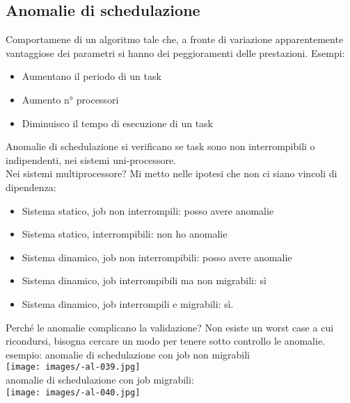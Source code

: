 \documentclass{article}
\begin{document}
\subsection{Anomalie di schedulazione}
Comportamene di un algoritmo tale che, a fronte di variazione apparentemente vantaggiose dei parametri si hanno dei peggioramenti delle prestazioni. Esempi:
\begin{itemize}
\item Aumentano il periodo di un task
\item Aumento n° processori
\item Diminuisco il tempo di esecuzione di un task
\end{itemize}
Anomalie di schedulazione si verificano se task sono non interrompibili o indipendenti, nei sistemi uni-processore.\\ Nei sistemi multiprocessore? Mi metto nelle ipotesi che non ci siano vincoli di dipendenza:\\
\begin{itemize}
\item Sistema statico, job non interrompili: posso avere anomalie
\item Sistema statico, interrompibili: non ho anomalie
\item Sistema dinamico, job non interrompibili: posso avere anomalie
\item Sistema dinamico, job interrompibili ma non migrabili: sì
\item Sistema dinamico, job interrompili e migrabili: sì.
\end{itemize}
Perché le anomalie complicano la validazione? Non esiste un worst case a cui ricondursi, bisogna cercare un modo per tenere sotto controllo le anomalie.\\ esempio: anomalie di schedulazione con job non migrabili\\
\texttt{[image: images/-al-039.jpg]}\\
anomalie di schedulazione con job migrabili:\\
\texttt{[image: images/-al-040.jpg]}
\end{document}
